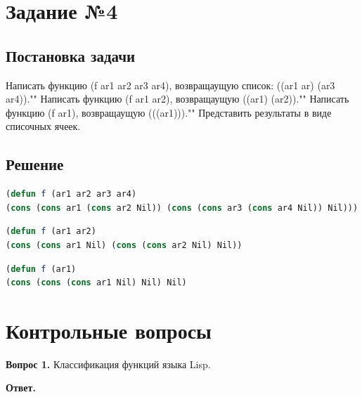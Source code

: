 \documentclass[12pt]{report}
\begin{document}
\section*{Задание №4}
\subsection*{Постановка задачи}
Написать функцию (f ar1 ar2 ar3 ar4), возвращаущую список: ((ar1 ar) (ar3 ar4)).""\newline
\indent Написать функцию (f ar1 ar2), возвращаущую ((ar1) (ar2)).""\newline
\indent Написать функцию (f ar1), возвращаущую (((ar1))).""\newline
\indent Представить результаты в виде списочных ячеек.
\subsection*{Решение}
\begin{lstlisting}[label=third,caption=Решение задания №4 (функция №1), language=lisp]
(defun f (ar1 ar2 ar3 ar4)
(cons (cons ar1 (cons ar2 Nil)) (cons (cons ar3 (cons ar4 Nil)) Nil)))
\end{lstlisting}

\begin{lstlisting}[label=third,caption=Решение задания №4 (функция №2), language=lisp]
(defun f (ar1 ar2)
(cons (cons ar1 Nil) (cons (cons ar2 Nil) Nil))
\end{lstlisting}

\begin{lstlisting}[label=third,caption=Решение задания №4 (функция №3), language=lisp]
(defun f (ar1)
(cons (cons (cons ar1 Nil) Nil) Nil)

\end{lstlisting}

	
\section*{Контрольные вопросы}
\textbf{Вопрос 1.} Классификация функций языка Lisp.
	
\textbf{Ответ.} 
	
\end{document}
